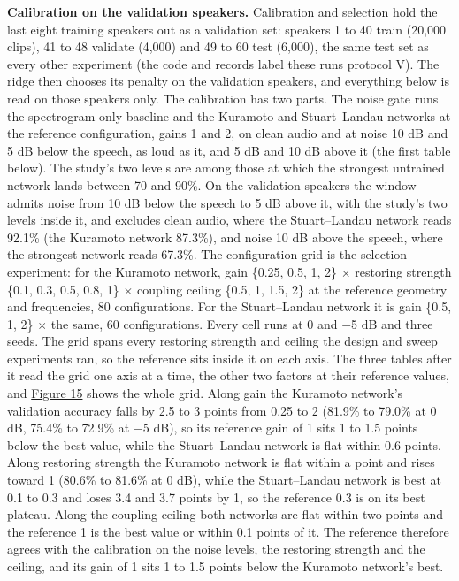 \documentclass{article}
\begin{document}
\textbf{Calibration on the validation speakers.} Calibration and
selection hold the last eight training speakers out as a validation set:
speakers 1 to 40 train (20,000 clips), 41 to 48 validate (4,000) and 49
to 60 test (6,000), the same test set as every other experiment (the
code and records label these runs protocol V). The ridge then chooses
its penalty on the validation speakers, and everything below is read on
those speakers only. The calibration has two parts. The noise gate runs
the spectrogram-only baseline and the Kuramoto and Stuart--Landau
networks at the reference configuration, gains 1 and 2, on clean audio
and at noise 10 dB and 5 dB below the speech, as loud as it, and 5 dB
and 10 dB above it (the first table below). The study's two levels are
among those at which the strongest untrained network lands between 70
and 90\%. On the validation speakers the window admits noise from 10 dB
below the speech to 5 dB above it, with the study's two levels inside
it, and excludes clean audio, where the Stuart--Landau network reads
92.1\% (the Kuramoto network 87.3\%), and noise 10 dB above the speech,
where the strongest network reads 67.3\%. The configuration grid is the
selection experiment: for the Kuramoto network, gain \{0.25, 0.5, 1, 2\}
\ensuremath{\times} restoring strength \{0.1, 0.3, 0.5, 0.8, 1\}
\ensuremath{\times} coupling ceiling \{0.5, 1, 1.5, 2\} at the reference
geometry and frequencies, 80 configurations. For the Stuart--Landau
network it is gain \{0.5, 1, 2\} \ensuremath{\times} the same, 60
configurations. Every cell runs at 0 and \ensuremath{-}5 dB and three
seeds. The grid spans every restoring strength and ceiling the design
and sweep experiments ran, so the reference sits inside it on each axis.
The three tables after it read the grid one axis at a time, the other
two factors at their reference values, and
\hyperref[fig-fig14-appF-calibration]{Figure 15} shows the whole grid.
Along gain the Kuramoto network's validation accuracy falls by 2.5 to 3
points from 0.25 to 2 (81.9\% to 79.0\% at 0 dB, 75.4\% to 72.9\% at
\ensuremath{-}5 dB), so its reference gain of 1 sits 1 to 1.5 points
below the best value, while the Stuart--Landau network is flat within
0.6 points. Along restoring strength the Kuramoto network is flat within
a point and rises toward 1 (80.6\% to 81.6\% at 0 dB), while the
Stuart--Landau network is best at 0.1 to 0.3 and loses 3.4 and 3.7
points by 1, so the reference 0.3 is on its best plateau. Along the
coupling ceiling both networks are flat within two points and the
reference 1 is the best value or within 0.1 points of it. The reference
therefore agrees with the calibration on the noise levels, the restoring
strength and the ceiling, and its gain of 1 sits 1 to 1.5 points below
the Kuramoto network's best.
\end{document}
